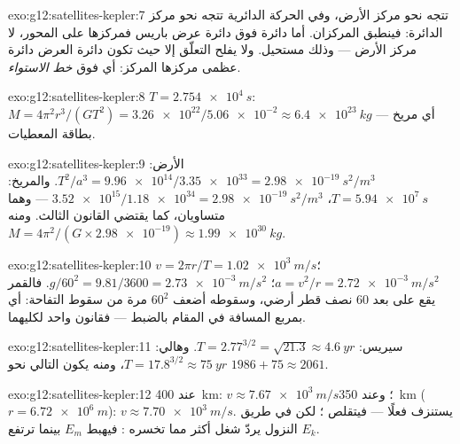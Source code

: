 \begin{solution}{exo:g12:satellites-kepler:7}
تتجه  نحو مركز الأرض، وفي الحركة الدائرية تتجه  نحو مركز الدائرة: فينطبق المركزان. أما
دائرة فوق دائرة عرض باريس فمركزها على المحور، لا مركز
الأرض --- وذلك مستحيل. ولا يفلح التعلّق إلا حيث تكون دائرة العرض
دائرة عظمى مركزها المركز: أي فوق \emph{خط الاستواء}.
\end{solution}

\begin{solution}{exo:g12:satellites-kepler:8}
$T = \qty{2.754e4}{s}$: $M = 4\pi^2 r^3/(GT^2) =
\num{3.26e22}/\num{5.06e-2} \approx \qty{6.4e23}{kg}$ --- أي مريخ بطاقة
المعطيات.
\end{solution}

\begin{solution}{exo:g12:satellites-kepler:9}
الأرض: $T^2/a^3 = \num{9.96e14}/\num{3.35e33} =
\qty{2.98e-19}{s^2/m^3}$. والمريخ: $T = \qty{5.94e7}{s}$،
$\num{3.52e15}/\num{1.18e34} = \qty{2.98e-19}{s^2/m^3}$ --- وهما متساويان، كما
يقتضي القانون الثالث. ومنه $M = 4\pi^2/(G \times \num{2.98e-19})
\approx \qty{1.99e30}{kg}$.
\end{solution}

\begin{solution}{exo:g12:satellites-kepler:10}
$v = 2\pi r/T = \qty{1.02e3}{m/s}$؛ $a = v^2/r =
\qty{2.72e-3}{m/s^2}$؛ $g/60^2 = 9.81/3600 = \qty{2.73e-3}{m/s^2}$.
فالقمر يقع على بعد $60$ نصف قطر أرضي، وسقوطه أضعف $60^2$ مرة
من سقوط التفاحة: أي بمربع المسافة في المقام بالضبط --- فقانون واحد
لكليهما.
\end{solution}

\begin{solution}{exo:g12:satellites-kepler:11}
سيريس: $T = 2.77^{3/2} = \sqrt{21.3} \approx \qty{4.6}{yr}$. وهالي:
$T = 17.8^{3/2} \approx \qty{75}{yr}$، ومنه يكون  التالي نحو
$1986 + 75 \approx 2061$.
\end{solution}

\begin{solution}{exo:g12:satellites-kepler:12}
عند \qty{400}{km}: $v \approx \qty{7.67e3}{m/s}$؛ وعند \qty{350}{km}
($r = \qty{6.72e6}{m}$): $v \approx \qty{7.70e3}{m/s}$.  يستنزف
 فعلًا --- فيتقلص ؛ لكن في طريق النزول
يردّ شغل  أكثر مما تخسره  :
فيهبط $E_m$ بينما ترتفع $E_k$.
\end{solution}

